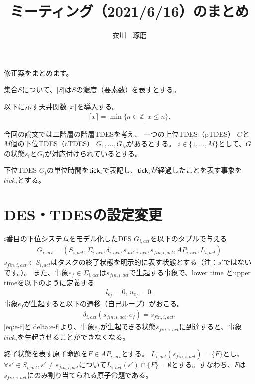 \documentclass[ 10pt]{jsarticle}
\title{ミーティング（2021/6/16）のまとめ}
\author{衣川　琢磨}
\newcommand{\req}[1]{\eqref{#1}}
\newcommand{\tick}{{\sf tick}}
\begin{document}
\maketitle
修正案をまとめます。

集合$S$について、$|S|$は$S$の濃度（要素数）を表すとする。

以下に示す天井関数$\lceil x \rceil$を導入する。
\begin{align}
\lceil x \rceil =\min\{n\in\mathbb{Z}|\ x\leq n\}.
\end{align}

今回の論文では二階層の階層TDESを考え、
一つの上位TDES（pTDES） $G$と$M$個の下位TDES（cTDES） $G_1,\ldots,G_M$があるとする。
$i\in\{1,\ldots,M\}$として、$G$の状態$s_i$と$G_i$が対応付けられているとする。

下位TDES $G_i$の単位時間を$\tick_i$で表記し、$\tick_i$が経過したことを表す事象を$\textit{tick}_i$とする。

%
%
\section{DES・TDESの設定変更}

$i$番目の下位システムをモデル化したDES $G_{i,\textit{act}}$を以下のタプルで与える
\begin{align}
G_{i,\textit{act}}=(S_{i,\textit{act}},\Sigma_{i,\textit{act}},\delta_{i,\textit{act}},s_{\textit{init},i,\textit{act}},s_{\textit{fin},i,\textit{act}},\textit{AP}_{i,\textit{act}},L_{i,\textit{act}})
\end{align}
$s_{\textit{fin},i,\textit{act}}\in S_{i,\textit{act}}$はタスクの終了状態を明示的に表す状態とする（注：$s'$ではないです。）。
また、事象$e_f\in\Sigma_{i,\textit{act}} $は$s_{\textit{fin},i,\textit{act}}$で生起する事象で、lower time とupper timeを以下のように定義する
\begin{align}
l_{e_f}=0,\ u_{e_f}=0.\label{eq:e-f}
\end{align}
%
事象$e_f$が生起すると以下の遷移（自己ループ）がおこる。
\begin{align}
\delta_{i,act}(s_{\textit{fin},i,\textit{act}},e_f)=s_{\textit{fin},i,\textit{act}}.\label{delta:e-f}
\end{align}
\req{eq:e-f}と\req{delta:e-f}より、事象$e_f$が生起できる状態$s_{\textit{fin},i,\textit{act}}$に到達すると、事象$\textit{tick}_i$を生起させることができなくなる。

終了状態を表す原子命題を$F\in \textit{AP}_{i,\textit{act}}$とする。
$L_{i,\textit{act}}(s_{\textit{fin},i,\textit{act}})=\{F\}$とし、$\forall s'\in S_{i,\textit{act}},s'\neq s_{\textit{fin},i,\textit{act}}$について$L_{i,\textit{act}}(s') \cap \{F\}=\emptyset$とする。すなわち、$F$は$s_{\textit{fin},i,\textit{act}}$にのみ割り当てられる原子命題である。
\end{document}
